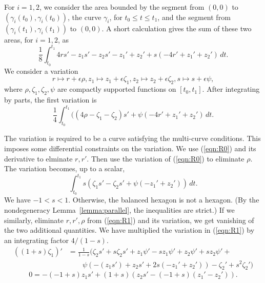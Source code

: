 \documentclass[11pt]{amsart}
\begin{document}
For $i=1,2$, 
we consider the area bounded by the segment from $(0,0)$ to $(\gamma_i(t_0),\gamma_i(t_0))$,
the curve $\gamma_i$, for $t_0\le t\le t_1$, and the segment from $(\gamma_i(t_1),\gamma_i(t_1))$ to $(0,0)$.  A short calculation gives the sum of these two areas, for $i=1,2$, as
$$
\frac1 8 \int_{t_0}^{t_1} 4 r s' - z_1 s' - z_2 s' - z_1' + z_2' + s(-4 r'+z_1'+z_2')\,dt.
$$
We consider a variation 
$$
  r\mapsto r + \epsilon \rho, z_1\mapsto z_1+\epsilon \zeta_1, z_2\mapsto z_2+\epsilon \zeta_2,
  s\mapsto s + \epsilon \psi,
$$
where $\rho,\zeta_1,\zeta_2,\psi$ are compactly supported functions on $[t_0,t_1]$.
After integrating by parts, the first variation is
\begin{equation}%
\label{eqn:V0A}
  \frac 1 4 \int_{t_0}^{t_1} ((4\rho -\zeta_1 - \zeta_2) s' + \psi (-4 r' + z_1' + z_2')\,dt.
\end{equation}

The variation is required to be a curve satisfying the multi-curve conditions.  This imposes some differential constraints on the variation.  We use (\ref{eqn:R0}) and its derivative to elminate $r,r'$.  Then use the variation of (\ref{eqn:R0}) to eliminate $\rho$. 
The variation becomes, up to a scalar,
\begin{equation}\label{eqn:V0B}
\int_{t_0}^{t_1} s (\zeta_1 s' - \zeta_2 s' + \psi (-z_1' + z_2'))\,dt.
\end{equation}
We have $-1 < s < 1$.  Otherwise, the balanced hexagon is not a hexagon.  (By the nondegeneracy Lemma~\ref{lemma:parallel}, the inequalities are strict.)  If we similarly, eliminate $r,r',\rho$ from (\ref{eqn:R1}) and its variation, we get vanishing of the two additional quantities.  We have multiplied the variation in (\ref{eqn:R1}) by an integrating factor $4/(1-s)$.
\begin{equation}\label{eqn:R1A}
 \begin{array}{lll}
  ((1+s)\zeta_1)' &= \frac 1 {1-s}
 ( \zeta_2 s' + 
   s \zeta_2 s' + z_1 \psi' - 
   s z_1 \psi' + z_2 \psi' + 
   s z_2 \psi' +\\
   &\quad\quad\psi (-(z_1 s') + 
     z_2 s' + 2 s (-z_1' + z_2')) 
    - \zeta_2' + 
   s^2 \zeta_2')
   \end{array}
\end{equation}
\begin{equation}\label{eqn:R1B}
  0 = -(-1 + s) z_1 s' + (1+s) (z_2 s' - (-1+s)(z_1' - z_2')).
\end{equation}
\end{document}
